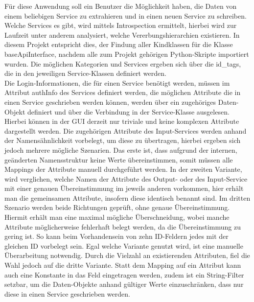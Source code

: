 Für diese Anwendung soll ein Benutzer die Möglichkeit haben, die Daten von einem beliebigen Service zu extrahieren und in einen neuen Service zu schreiben. Welche Services es gibt, wird mittels Introspection ermittelt, hierbei wird zur Laufzeit unter anderem analysiert, welche Vererbungshierarchien existieren\cite{Chun.2001}. In diesem Projekt entspricht dies, der Findung aller Kindklassen für die Klasse baseApiInterface, nachdem alle zum Projekt gehörigen Python-Skripte importiert wurden. Die möglichen Kategorien und Services ergeben sich über die id\_tags, die in den jeweiligen Service-Klassen definiert werden. \\
Die Login-Informationen, die für einen Service benötigt werden, müssen im Attribut authInfo des Services definiert werden, die möglichen Attribute die in einen Service geschrieben werden können, werden über ein zugehöriges Daten-Objekt definiert und über die Verbindung in der Service-Klasse ausgelesen. Hierbei können in der GUI derzeit nur triviale und keine komplexen Attribute dargestellt werden. Die zugehörigen Attribute des Input-Services werden anhand der Namensähnlichkeit vorbelegt, um diese zu übertragen, hierbei ergeben sich jedoch mehrere mögliche Szenarien. Das erste ist, dass aufgrund der internen, geänderten Namensstruktur keine Werte übereinstimmen, somit müssen alle Mappings der Attribute manuell durchgeführt werden. In der zweiten Variante, wird verglichen, welche Namen der Attribute des Output- oder des Input-Service mit einer genauen Übereinstimmung im jeweils anderen vorkommen, hier erhält man die gemeinsamen Attribute, insofern diese identisch benannt sind. Im dritten Szenario werden beide Richtungen geprüft, ohne genaue Übereinstimmung. Hiermit erhält man eine maximal mögliche Überschneidung, wobei manche Attribute möglicherweise fehlerhaft belegt werden, da die Übereinstimmung zu gering ist. So kann beim Vorhandensein von zehn ID-Feldern jedes mit der gleichen ID vorbelegt sein. Egal welche Variante genutzt wird, ist eine manuelle Überarbeitung notwendig. Durch die Vielzahl an existierenden Attributen, fiel die Wahl jedoch auf die dritte Variante. Statt dem Mapping auf ein Attribut kann auch eine Konstante in das Feld eingetragen werden, zudem ist ein String-Filter setzbar, um die Daten-Objekte anhand gültiger Werte einzuschränken, dass nur diese in einen Service geschrieben werden.

